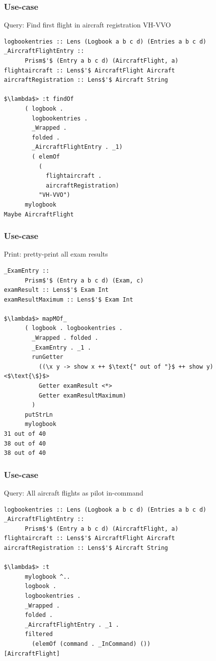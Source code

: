 \begin{frame}[fragile]
\frametitle{Use-case}
\begin{block}{Query: Find first flight in aircraft registration VH-VVO}
\begin{lstlisting}[style=haskell,basicstyle=\scriptsize\ttfamily,mathescape]
logbookentries :: Lens (Logbook a b c d) (Entries a b c d)
_AircraftFlightEntry ::
      Prism$'$ (Entry a b c d) (AircraftFlight, a)
flightaircraft :: Lens$'$ AircraftFlight Aircraft
aircraftRegistration :: Lens$'$ Aircraft String

$\lambda$> :t findOf
      ( logbook . 
        logbookentries . 
        _Wrapped . 
        folded . 
        _AircraftFlightEntry . _1)
        ( elemOf
          (
            flightaircraft . 
            aircraftRegistration)
          "VH-VVO")
      mylogbook
Maybe AircraftFlight
\end{lstlisting}
\end{block}
\end{frame}

\begin{frame}[fragile]
\frametitle{Use-case}
\begin{block}{Print: pretty-print all exam results}
\begin{lstlisting}[style=haskell,basicstyle=\scriptsize\ttfamily,mathescape]
_ExamEntry ::
      Prism$'$ (Entry a b c d) (Exam, c)
examResult :: Lens$'$ Exam Int
examResultMaximum :: Lens$'$ Exam Int

$\lambda$> mapMOf_
      ( logbook . logbookentries .
        _Wrapped . folded .
        _ExamEntry . _1 .
        runGetter
          ((\x y -> show x ++ $\text{" out of "}$ ++ show y) <$\text{\$}$>
          Getter examResult <*>
          Getter examResultMaximum)
        )
      putStrLn
      mylogbook
31 out of 40
38 out of 40
38 out of 40
\end{lstlisting}
\end{block}
\end{frame}

\begin{frame}[fragile]
\frametitle{Use-case}
\begin{block}{Query: All aircraft flights as pilot in-command}
\begin{lstlisting}[style=haskell,basicstyle=\scriptsize\ttfamily,mathescape]
logbookentries :: Lens (Logbook a b c d) (Entries a b c d)
_AircraftFlightEntry ::
      Prism$'$ (Entry a b c d) (AircraftFlight, a)
flightaircraft :: Lens$'$ AircraftFlight Aircraft
aircraftRegistration :: Lens$'$ Aircraft String

$\lambda$> :t
      mylogbook ^..
      logbook .
      logbookentries .
      _Wrapped .
      folded .
      _AircraftFlightEntry . _1 .
      filtered
        (elemOf (command . _InCommand) ())
[AircraftFlight]
\end{lstlisting}
\end{block}
\end{frame}

